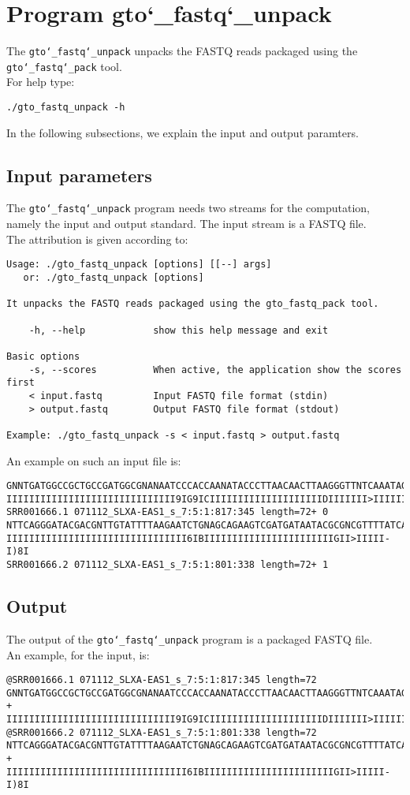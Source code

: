 \section{Program gto\char`_fastq\char`_unpack}
The \texttt{gto\char`_fastq\char`_unpack} unpacks the FASTQ reads packaged using the \texttt{gto\char`_fastq\char`_pack} tool.\\
For help type:
\begin{lstlisting}
./gto_fastq_unpack -h
\end{lstlisting}
In the following subsections, we explain the input and output paramters.

\subsection*{Input parameters}

The \texttt{gto\char`_fastq\char`_unpack} program needs two streams for the computation,
namely the input and output standard. The input stream is a FASTQ file.\\
The attribution is given according to:
\begin{lstlisting}
Usage: ./gto_fastq_unpack [options] [[--] args]
   or: ./gto_fastq_unpack [options]

It unpacks the FASTQ reads packaged using the gto_fastq_pack tool.

    -h, --help            show this help message and exit

Basic options
    -s, --scores          When active, the application show the scores first
    < input.fastq         Input FASTQ file format (stdin)
    > output.fastq        Output FASTQ file format (stdout)

Example: ./gto_fastq_unpack -s < input.fastq > output.fastq
\end{lstlisting}
An example on such an input file is:
\begin{lstlisting}
GNNTGATGGCCGCTGCCGATGGCGNANAATCCCACCAANATACCCTTAACAACTTAAGGGTTNTCAAATAGA
IIIIIIIIIIIIIIIIIIIIIIIIIIIIII9IG9ICIIIIIIIIIIIIIIIIIIIIDIIIIIII>IIIIII/
SRR001666.1 071112_SLXA-EAS1_s_7:5:1:817:345 length=72+	0
NTTCAGGGATACGACGNTTGTATTTTAAGAATCTGNAGCAGAAGTCGATGATAATACGCGNCGTTTTATCAN
IIIIIIIIIIIIIIIIIIIIIIIIIIIIIIII6IBIIIIIIIIIIIIIIIIIIIIIIIGII>IIIII-I)8I
SRR001666.2 071112_SLXA-EAS1_s_7:5:1:801:338 length=72+ 1
\end{lstlisting}

\subsection*{Output}
The output of the \texttt{gto\char`_fastq\char`_unpack} program is a packaged FASTQ file.\\
An example, for the input, is:
\begin{lstlisting}
@SRR001666.1 071112_SLXA-EAS1_s_7:5:1:817:345 length=72
GNNTGATGGCCGCTGCCGATGGCGNANAATCCCACCAANATACCCTTAACAACTTAAGGGTTNTCAAATAGA
+
IIIIIIIIIIIIIIIIIIIIIIIIIIIIII9IG9ICIIIIIIIIIIIIIIIIIIIIDIIIIIII>IIIIII/
@SRR001666.2 071112_SLXA-EAS1_s_7:5:1:801:338 length=72
NTTCAGGGATACGACGNTTGTATTTTAAGAATCTGNAGCAGAAGTCGATGATAATACGCGNCGTTTTATCAN
+
IIIIIIIIIIIIIIIIIIIIIIIIIIIIIIII6IBIIIIIIIIIIIIIIIIIIIIIIIGII>IIIII-I)8I
\end{lstlisting}
